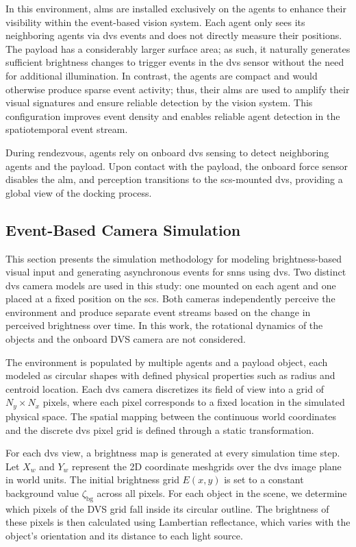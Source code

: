 In this environment, \ac{alm}s are installed exclusively on the agents to enhance their visibility within the event-based vision system. Each agent only sees its neighboring agents via \ac{dvs} events and does not directly measure their positions. The payload has a considerably larger surface area; as such, it naturally generates sufficient brightness changes to trigger events in the \ac{dvs} sensor without the need for additional illumination. In contrast, the agents are compact and would otherwise produce sparse event activity; thus, their \acp{alm} are used to amplify their visual signatures and ensure reliable detection by the vision system. 
This configuration improves event density and enables reliable agent detection in the spatiotemporal event stream.


During rendezvous, agents rely on onboard \ac{dvs} sensing to detect neighboring agents and the payload. Upon contact with the payload, the onboard force sensor disables the \ac{alm}, and perception transitions to the \ac{scs}-mounted \ac{dvs}, providing a global view of the docking process.


\subsection{Event-Based Camera Simulation}

This section presents the simulation methodology for modeling brightness-based visual input and generating asynchronous events for \ac{snn}s using \ac{dvs}. Two distinct \ac{dvs} camera models are used in this study: one mounted on each agent and one placed at a fixed position on the \ac{scs}. Both cameras independently perceive the environment and produce separate event streams based on the change in perceived brightness over time. In this work, the rotational dynamics of the objects and the onboard DVS camera are not considered.

The environment is populated by multiple agents and a payload object, each modeled as circular shapes with defined physical properties such as radius and centroid location. Each \ac{dvs} camera discretizes its field of view into a grid of $N_y \times N_x$ pixels, where each pixel corresponds to a fixed location in the simulated physical space. The spatial mapping between the continuous world coordinates and the discrete \ac{dvs} pixel grid is defined through a static transformation.

For each \ac{dvs} view, a brightness map is generated at every simulation time step. Let $X_w$ and $Y_w$ represent the 2D coordinate meshgrids over the \ac{dvs} image plane in world units. The initial brightness grid $E(x,y)$ is set to a constant background value $\zeta_{\text{bg}}$ across all pixels. For each object in the scene, we determine which pixels of the DVS grid fall inside its circular outline. The brightness of these pixels is then calculated using Lambertian reflectance, which varies with the object’s orientation and its distance to each light source.

